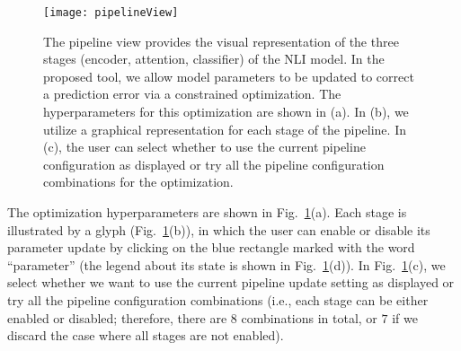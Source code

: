 \begin{figure}[htbp]
\centering
\vspace{-3mm}
 \texttt{[image: pipelineView]}
 \vspace{-2mm}
 \caption{
The pipeline view provides the visual representation of the three stages (encoder, attention, classifier) of the NLI model. 
%
In the proposed tool, we allow model parameters to be updated to correct a prediction error via a constrained optimization.
The hyperparameters for this optimization are shown in (a). 
In (b), we utilize a graphical representation for each stage of the pipeline.
In (c), the user can select whether to use the current pipeline configuration as displayed or try all the pipeline configuration combinations for the optimization. %
}
\label{fig:pipelineView}
\vspace{-2mm}
\end{figure}

The optimization hyperparameters are shown in Fig.~\ref{fig:pipelineView}(a). Each stage is illustrated by a glyph (Fig.~\ref{fig:pipelineView}(b)), in which the user can enable or disable its parameter update by clicking on the blue rectangle marked with the word ``parameter'' (the legend about its state is shown in Fig.~\ref{fig:pipelineView}(d)). In Fig.~\ref{fig:pipelineView}(c), we select whether we want to use the current pipeline update setting as displayed or try all the pipeline configuration combinations (i.e., each stage can be either enabled or disabled; therefore, there are $8$ combinations in total, or $7$ if we discard the case where all stages are not enabled).



